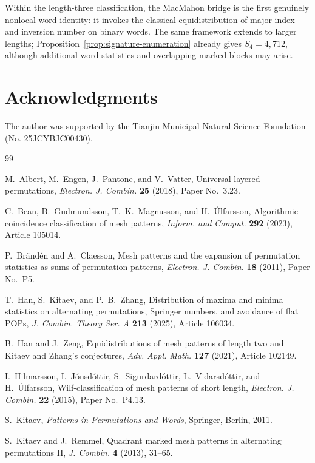 \documentclass[12pt]{article}
\begin{document}
Within the length-three classification, the MacMahon bridge is the first
genuinely nonlocal word identity: it invokes the classical equidistribution
of major index and inversion number on binary words.  The same framework
extends to larger lengths; Proposition~\ref{prop:signature-enumeration}
already gives $S_4=4{,}712$, although additional word statistics and
overlapping marked blocks may arise.

\section*{Acknowledgments}

The author was supported by the Tianjin Municipal Natural Science Foundation
(No. 25JCYBJC00430).

\begin{thebibliography}{99}

M.~Albert, M.~Engen, J.~Pantone, and V.~Vatter,
Universal layered permutations,
\emph{Electron. J. Combin.} \textbf{25} (2018), Paper No.~3.23.

C.~Bean, B.~Gudmundsson, T.~K.~Magnusson, and H.~\'Ulfarsson,
Algorithmic coincidence classification of mesh patterns,
\emph{Inform. and Comput.} \textbf{292} (2023), Article 105014.

P.~Br\"and\'en and A.~Claesson,
Mesh patterns and the expansion of permutation statistics as sums of
permutation patterns,
\emph{Electron. J. Combin.} \textbf{18} (2011), Paper No.~P5.

T.~Han, S.~Kitaev, and P.~B.~Zhang,
Distribution of maxima and minima statistics on alternating permutations,
Springer numbers, and avoidance of flat POPs,
\emph{J. Combin. Theory Ser. A} \textbf{213} (2025), Article 106034.

B.~Han and J.~Zeng,
Equidistributions of mesh patterns of length two and Kitaev and Zhang's
conjectures,
\emph{Adv. Appl. Math.} \textbf{127} (2021), Article 102149.

I.~Hilmarsson, I.~J\'onsd\'ottir, S.~Sigurdard\'ottir,
L.~Vidarsd\'ottir, and H.~\'Ulfarsson,
Wilf-classification of mesh patterns of short length,
\emph{Electron. J. Combin.} \textbf{22} (2015), Paper No.~P4.13.

S.~Kitaev,
\emph{Patterns in Permutations and Words},
Springer, Berlin, 2011.

S.~Kitaev and J.~Remmel,
Quadrant marked mesh patterns in alternating permutations II,
\emph{J. Combin.} \textbf{4} (2013), 31--65.


\end{thebibliography}
\end{document}
